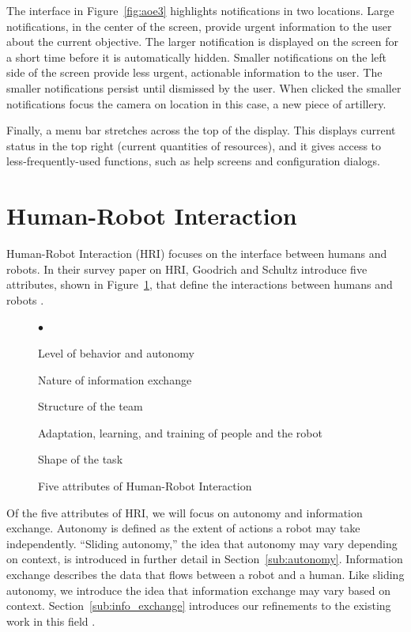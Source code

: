 The interface in Figure~\ref{fig:aoe3} highlights notifications in two locations. Large notifications, in the center of the screen, provide urgent information to the user about the current objective. The larger notification is displayed on the screen for a short time before it is automatically hidden. Smaller notifications on the left side of the screen provide less urgent, actionable information to the user. The smaller notifications persist until dismissed by the user. When clicked the smaller notifications focus the camera on location in this case, a new piece of artillery.

Finally, a menu bar stretches across the top of the display. This displays current status in the top right (current quantities of resources), and it gives access to less-frequently-used functions, such as help screens and configuration dialogs.



\section{Human-Robot Interaction}
\label{sec:hri}
Human-Robot Interaction (HRI) focuses on the interface between humans and robots. In their survey paper on HRI, Goodrich and Schultz introduce five attributes, shown in Figure~\ref{fig:five-attributes}, that define the interactions between humans and robots \cite{Goodrich_Survey}.

\begin{figure}[ht]
	\makebox[\textwidth]{\hrulefill}
	\begin{list}{$\bullet$}
		\item Level of behavior and autonomy
		\item \item Nature of information exchange %
		\item Structure of the team
		\item Adaptation, learning, and training of people and the robot
		\item Shape of the task
	\end{list}
	\makebox[\textwidth]{\hrulefill}
	\caption{Five attributes of Human-Robot Interaction \label{fig:five-attributes}}
\end{figure}

Of the five attributes of HRI, we will focus on autonomy and information exchange. Autonomy is defined as the extent of actions a robot may take independently. ``Sliding autonomy,'' the idea that autonomy may vary depending on context, is introduced in further detail in Section~\ref{sub:autonomy}. Information exchange describes the data that flows between a robot and a human. Like sliding autonomy, we introduce the idea that information exchange may vary based on context. Section~\ref{sub:info_exchange} introduces our refinements to the existing work in this field  \cite{Goodrich_Survey}.


